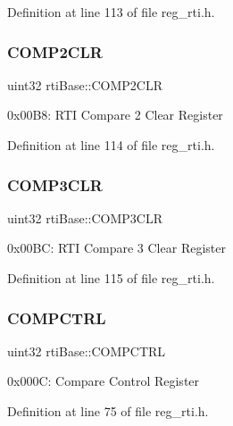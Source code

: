 Definition at line 113 of file reg\+\_\+rti.\+h.

\mbox{\label{structrtiBase_a35ca0260e91f7626d68cf8d5ec8414c2}} 
\subsubsection{\texorpdfstring{C\+O\+M\+P2\+C\+LR}{COMP2CLR}}
{\footnotesize\ttfamily uint32 rti\+Base\+::\+C\+O\+M\+P2\+C\+LR}

0x00\+B8\+: R\+TI Compare 2 Clear Register 

Definition at line 114 of file reg\+\_\+rti.\+h.

\mbox{\label{structrtiBase_acd6654f6188cb394c333a0e8498f346b}} 
\subsubsection{\texorpdfstring{C\+O\+M\+P3\+C\+LR}{COMP3CLR}}
{\footnotesize\ttfamily uint32 rti\+Base\+::\+C\+O\+M\+P3\+C\+LR}

0x00\+BC\+: R\+TI Compare 3 Clear Register 

Definition at line 115 of file reg\+\_\+rti.\+h.

\mbox{\label{structrtiBase_a855df13fa648066597a35bcc76c98033}} 
\subsubsection{\texorpdfstring{C\+O\+M\+P\+C\+T\+RL}{COMPCTRL}}
{\footnotesize\ttfamily uint32 rti\+Base\+::\+C\+O\+M\+P\+C\+T\+RL}

0x000C\+: Compare Control Register 

Definition at line 75 of file reg\+\_\+rti.\+h.

\mbox{\label{structrtiBase_ac0def4a313900e51727d08705bfffc54}} 
